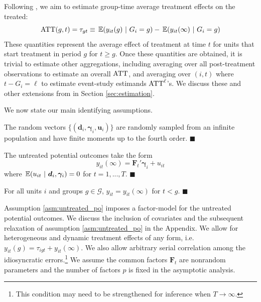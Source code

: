 \documentclass[12pt]{article}
\begin{document}
Following \citet{Callaway_Santanna_2021}, we aim to estimate group-time average treatment effects on the treated:
\begin{equation}
  \ATT(g,t) = \tau_{gt} \equiv \expec{y_{it}(g)}{G_i = g} - \expec{y_{it}(\infty)}{G_i = g}
\end{equation}
These quantities represent the average effect of treatment at time $t$ for units that start treatment in period $g$ for $t \geq g$. Once these quantities are obtained, it is trivial to estimate other aggregations, including averaging over all post-treatment observations to estimate an overall $\text{ATT}$, and averaging over $(i,t)$ where $t - G_i = \ell$ to estimate event-study estimands $\text{ATT}^\ell$'s. We discuss these and other extensions from \citet{Callaway_Santanna_2021} in Section \ref{sec:estimation}.

We now state our main identifying assumptions.
\begin{assumption}\label{asm:sampling}
The random vectors $\{ (\bm d_i, \bm \gamma_i, \bm u_i) \}$ are randomly sampled from an infinite population and have finite moments up to the fourth order. $\blacksquare$
\end{assumption}

\begin{assumption}\label{asm:untreated_po}
The untreated potential outcomes take the form
\begin{equation*}
  y_{it}(\infty) = \bm{F}_t' \bm \gamma_i + u_{it}
\end{equation*}
where $\expec{u_{it}}{\bm d_i, \bm \gamma_i} = 0$ for $t = 1,...,T$. $\blacksquare$
\end{assumption}

\begin{assumption}\label{asm:no_anticipation}
For all units $i$ and groups $g \in \mathcal{G}$, $y_{it} = y_{it}(\infty)$ for $t < g$. $\blacksquare$ %
\end{assumption}

Assumption \ref{asm:untreated_po} imposes a factor-model for the untreated potential outcomes. We discuss the inclusion of covariates and the subsequent relaxation of assumption \ref{asm:untreated_po} in the Appendix. We allow for heterogeneous and dynamic treatment effects of any form, i.e. $y_{it}(g) = \tau_{igt} + y_{it}(\infty)$. We also allow arbitrary serial correlation among the idiosyncratic errors.\footnote{This condition may need to be strengthened for inference when $T \rightarrow \infty$.} We assume the common factors $\bm{F}_t$ are nonrandom parameters and the number of factors $p$ is fixed in the asymptotic analysis. 
\end{document}
